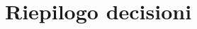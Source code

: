 \section{Riepilogo decisioni}
\def\modifiche{
    {VI020, Introdotta all'interno dell'Analisi dei Requisiti la terminologia Target e Feature},
}
